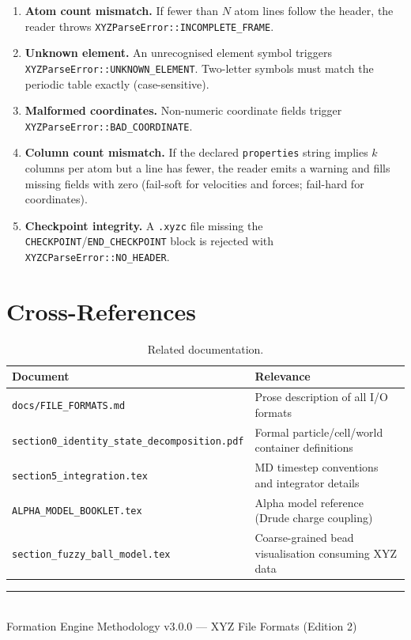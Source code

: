 \documentclass[12pt, a4paper, oneside]{article}
\newcommand{\file}[1]{\texttt{#1}}
\newcommand{\type}[1]{\texttt{#1}}
\begin{document}
\begin{enumerate}
  \item \textbf{Atom count mismatch.}  If fewer than $N$ atom lines
        follow the header, the reader throws
        \type{XYZParseError::INCOMPLETE\_FRAME}.
  \item \textbf{Unknown element.}  An unrecognised element symbol
        triggers \type{XYZParseError::UNKNOWN\_ELEMENT}.  Two-letter
        symbols must match the periodic table exactly (case-sensitive).
  \item \textbf{Malformed coordinates.}  Non-numeric coordinate fields
        trigger \type{XYZParseError::BAD\_COORDINATE}.
  \item \textbf{Column count mismatch.}  If the declared
        \texttt{properties} string implies $k$ columns per atom but
        a line has fewer, the reader emits a warning and fills missing
        fields with zero (fail-soft for velocities and forces; fail-hard
        for coordinates).
  \item \textbf{Checkpoint integrity.}  A \texttt{.xyzc} file missing
        the \texttt{CHECKPOINT}/\texttt{END\_CHECKPOINT} block is
        rejected with \type{XYZCParseError::NO\_HEADER}.
\end{enumerate}

\section{Cross-References}

\begin{table}[htbp]
  \centering
  \caption{Related documentation.}
  \label{tab:xrefs}
  \begin{tabular}{lp{8cm}}
    \toprule
    Document & Relevance \\
    \midrule
    \file{docs/FILE\_FORMATS.md}
      & Prose description of all I/O formats \\
    \file{section0\_identity\_state\_decomposition.pdf}
      & Formal particle/cell/world container definitions \\
    \file{section5\_integration.tex}
      & MD timestep conventions and integrator details \\
    \file{ALPHA\_MODEL\_BOOKLET.tex}
      & Alpha model reference (Drude charge coupling) \\
    \file{section\_fuzzy\_ball\_model.tex}
      & Coarse-grained bead visualisation consuming XYZ data \\
    \bottomrule
  \end{tabular}
\end{table}

\vfill

\begin{center}
\rule{0.5\textwidth}{0.4pt}\\[6pt]
\small Formation Engine Methodology v3.0.0 --- XYZ File Formats (Edition 2)
\end{center}
\end{document}
